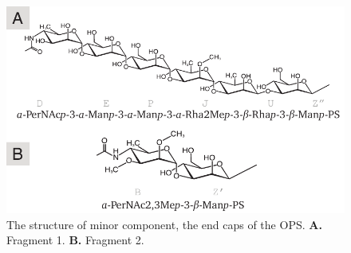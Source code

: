 		 \begin{figure}[htb]
		 	\begin{center}
		 		\includegraphics[]{lps_chapter/img/lpsends.pdf}
		 	\end{center}
		 	\caption[The structure of minor component, the end caps of the \ac{OPS}.]{The structure of minor component, the end caps of the \ac{OPS}. \textbf{A.} Fragment 1. \textbf{B.} Fragment 2.}
		 	\label{fig:lpsends}
		 \end{figure}

